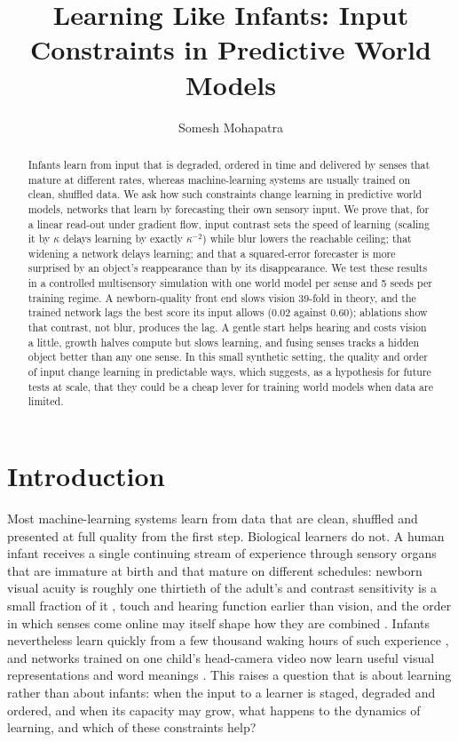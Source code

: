 \documentclass{article}
\title{Learning Like Infants: Input Constraints in Predictive World Models}
\author[1*]{Somesh Mohapatra}
\affil[1]{Independent.}
\affil[*]{Address correspondence to: pikulsomesh@gmail.com}
\date{}
\begin{document}
\maketitle

\begin{abstract}
Infants learn from input that is degraded, ordered in time and delivered by senses that mature at different rates, whereas machine-learning systems are usually trained on clean, shuffled data. We ask how such constraints change learning in predictive world models, networks that learn by forecasting their own sensory input. We prove that, for a linear read-out under gradient flow, input contrast sets the speed of learning (scaling it by \(\kappa\) delays learning by exactly \(\kappa^{-2}\)) while blur lowers the reachable ceiling; that widening a network delays learning; and that a squared-error forecaster is more surprised by an object's reappearance than by its disappearance. We test these results in a controlled multisensory simulation with one world model per sense and 5 seeds per training regime. A newborn-quality front end slows vision 39-fold in theory, and the trained network lags the best score its input allows (0.02 against 0.60); ablations show that contrast, not blur, produces the lag. A gentle start helps hearing and costs vision a little, growth halves compute but slows learning, and fusing senses tracks a hidden object better than any one sense. In this small synthetic setting, the quality and order of input change learning in predictable ways, which suggests, as a hypothesis for future tests at scale, that they could be a cheap lever for training world models when data are limited.
\end{abstract}

\section{Introduction}

Most machine-learning systems learn from data that are clean, shuffled and presented at full quality from the first step. Biological learners do not. A human infant receives a single continuing stream of experience through sensory organs that are immature at birth and that mature on different schedules: newborn visual acuity is roughly one thirtieth of the adult's and contrast sensitivity is a small fraction of it \autocite{banks1988optical,norcia1985spatial}, touch and hearing function earlier than vision, and the order in which senses come online may itself shape how they are combined \autocite{turkewitz1982limitations}. Infants nevertheless learn quickly from a few thousand waking hours of such experience \autocite{smith2018curriculum}, and networks trained on one child's head-camera video now learn useful visual representations and word meanings \autocite{orhan2020self,orhan2024learning,vong2024grounded}. This raises a question that is about learning rather than about infants: when the input to a learner is staged, degraded and ordered, and when its capacity may grow, what happens to the dynamics of learning, and which of these constraints help?
\end{document}
